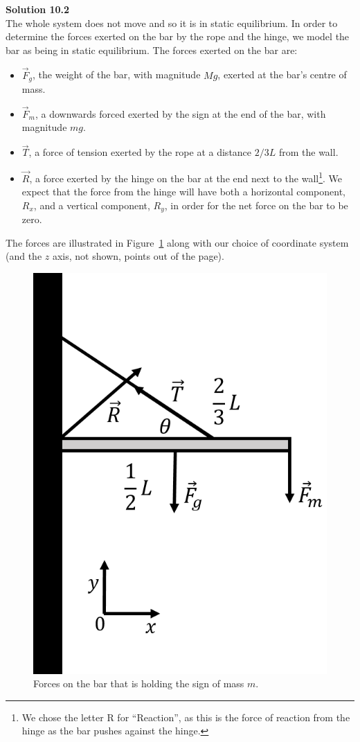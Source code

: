 \begin{framed}
\textbf{Solution 10.2}\\
The whole system does not move and so it is in static equilibrium. In order to determine the forces exerted on the bar by the rope and the hinge, we model the bar as being in static equilibrium. The forces exerted on the bar are:

\begin{itemize}
\item $\vec F_g$, the weight of the bar, with magnitude $Mg$, exerted at the bar's centre of mass.
\item $\vec F_m$, a downwards forced exerted by the sign at the end of the bar, with magnitude $mg$.
\item $\vec T$, a force of tension exerted by the rope at a distance $2/3 L$ from the wall.
\item $\vec R$, a force exerted by the hinge on the bar at the end next to the wall\footnote{We chose the letter R for ``Reaction'', as this is the force of reaction from the hinge as the bar pushes against the hinge.}. We expect that the force from the hinge will have both a horizontal component, $R_x$, and a vertical component, $R_y$, in order for the net force on the bar to be zero.
\end{itemize}

The forces are illustrated in Figure~\ref{fig:rotationaldynamics:sign_fbd} along with our choice of coordinate system (and the $z$ axis, not shown, points out of the page).

\begin{figure}[!htbp]
\centering
\includegraphics[width=0.375\linewidth]{files/sign_fbd-ffe4168e450dcf3dc23b6bf92f8cb8c1.png}
\caption[]{Forces on the bar that is holding the sign of mass $m$.}
\label{fig:rotationaldynamics:sign_fbd}
\end{figure}


\end{framed}
